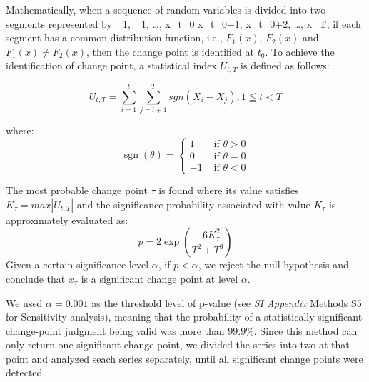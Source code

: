 		Mathematically, when a sequence of random variables is divided into two segments represented by _{1}, _{1}, \ldots, x_{t_{0}}  x_{t_{0}+1}, x_{t_{0}+2}, \ldots, x_{T}, if each segment has a common distribution function, i.e., $F_1(x)$, $F_2(x)$ and $F_1(x) \neq F_2(x)$, then the change point is identified at $t_0$. To achieve the identification of change point, a statistical index $U_{t,T}$ is defined as follows:

		\begin{equation}
			U_{t, T} = \sum_{i=1}^t\sum_{j=t+1}^T sgn(X_i - X_j), 1 \leqq t < T
		\end{equation}

		where:
		\begin{equation}
			\operatorname{sgn}(\theta)= \begin{cases}1 & \text { if } \theta>0 \\ 0 & \text { if } \theta=0 \\ -1 & \text { if } \theta<0\end{cases}
		\end{equation}

		The most probable change point $\tau$ is found where its value satisfies $K_{\tau} = max|U_{t, T}|$ and the significance probability associated with value $K_{\tau}$ is approximately evaluated as:
		\begin{equation}
			p=2 \exp \left(\frac{-6 K_{\tau}^{2}}{T^{2}+T^{3}}\right)
		\end{equation}
		Given a certain significance level $\alpha$, if $p < \alpha$, we reject the null hypothesis and conclude that $x_{\tau}$ is a significant change point at level $\alpha$.

		We used $\alpha = 0.001$ as the threshold level of p-value (see \textit{SI Appendix} Methods S5 for Sensitivity analysis), meaning that the probability of a statistically significant change-point judgment being valid was more than $99.9\%$.
		Since this method can only return one significant change point, we divided the series into two at that point and analyzed seach series separately, until all significant change points were detected.

